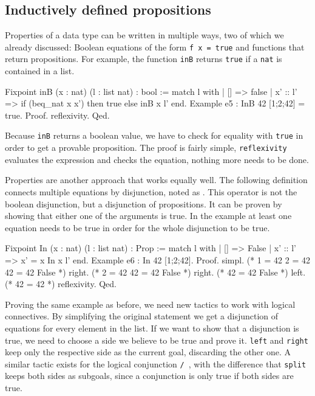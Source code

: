 \documentclass[paper = a4, fleqn, abstract=on, twoside]{scrreprt}
\newcommand{\coqinline}[1]{\texttt{#1}}
\begin{document}
\subsection{Inductively defined propositions}
\label{induprop}
Properties of a data type can be written in multiple ways, two of which we already discussed: Boolean equations of the form \coqinline{f x = true} and functions that return propositions. For example, the function \coqinline{inB} returns \coqinline{true} if a \coqinline{nat} is contained in a list.
\begin{coqcode}
Fixpoint inB (x : nat) (l : list nat) : bool :=
  match l with
  | [] => false
  | x' :: l' => if (beq_nat x x') then true else inB x l'
  end.
Example e5 : InB 42 [1;2;42] = true.
Proof. reflexivity. Qed.
\end{coqcode}
Because \coqinline{inB} returns a boolean value, we have to check for equality with \coqinline{true} in order to get a provable proposition. The proof is fairly simple, \coqinline{reflexivity} evaluates the expression and checks the equation, nothing more needs to be done.\\
\par \noindent
Properties are another approach that works equally well. The following definition connects multiple equations by disjunction, noted as \coqinline{\/}. This operator is not the boolean disjunction, but a disjunction of propositions. It can be proven by showing that either one of the arguments is true. In the example at least one equation needs to be true in order for the whole disjunction to be true. 
\begin{coqcode}
Fixpoint In (x : nat) (l : list nat) : Prop :=
  match l with
  | [] => False
  | x' :: l' => x' = x \/ In x l'
  end.
Example e6 : In 42 [1;2;42].
Proof. 
  simpl. (* 1 = 42 \/ 2 = 42 \/ 42 = 42 \/ False *)
  right.           (* 2 = 42 \/ 42 = 42 \/ False *)
  right.                     (* 42 = 42 \/ False *)
  left.                      (* 42 = 42 *)
  reflexivity.
Qed.
\end{coqcode}
Proving the same example as before, we need new tactics to work with logical connectives. By simplifying the original statement we get a disjunction of equations for every element in the list. If we want to show that a disjunction is true, we need to choose a side we believe to be true and prove it. \coqinline{left} and \coqinline{right} keep only the respective side as the current goal, discarding the other one. A similar tactic exists for the logical conjunction \coqinline{/\ }, with the difference that \coqinline{split} keeps both sides as subgoals, since a conjunction is only true if both sides are true.\\
\end{document}
